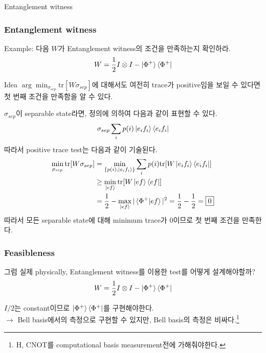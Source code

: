 \documentclass[9pt]{beamer}
\begin{document}
\begin{section}{Entanglement witness}
        \begin{frame}
            \frametitle{Entanglement witness}
            Example: 다음 $W$가 Entanglement witness의 조건을 만족하는지 확인하라.
            \begin{equation*}
                W = \frac{1}{2} I \otimes I - \ket{\Phi^+} \bra{\Phi^+}
            \end{equation*}
            \vspace{-0.2cm}
            \begin{block}{Idea}
                $\arg\min_{\sigma_{sep}} \text{tr}[W \sigma_{sep}]$에 대해서도 여전히 trace가 positive임을 보일 수 있다면 첫 번째 조건을 만족함을 알 수 있다.
            \end{block}
            $\sigma_{sep}$이 separable state라면, 정의에 의하여 다음과 같이 표현할 수 있다.
            \begin{equation*}
                \sigma_{sep} \sum_i p(i) \ket{e_if_i} \bra{e_if_i}
            \end{equation*}
            따라서 positive trace test는 다음과 같이 기술된다.
            \begin{align*}
                \min_{\rho_{sep}} \text{tr}[W\sigma_{sep}] &= \min_{\{p(i),\ket{e_if_i}\}} \sum_i p(i) \text{tr}[W \ket{e_if_i} \bra{e_if_i}] \\
                &\ge \min_{\ket{ef}} \text{tr}[W \ket{ef} \bra{ef}]\\
                &=\frac{1}{2} - \max_{\ket{ef}} |\braket{\Phi^+|ef}|^2 = \frac{1}{2} - \frac{1}{2} = \boxed{0}
            \end{align*}
            따라서 모든 separable state에 대해 minimum trace가 0이므로 첫 번째 조건을 만족한다.
        \end{frame}
        
        \begin{frame}
            \frametitle{Feasibleness}
            그럼 실제 physically, Entanglement witness를 이용한 test를 어떻게 설계해야할까?
            \begin{equation*}
                W = \frac{1}{2} I \otimes I - \ket{\Phi^+} \bra{\Phi^+}
            \end{equation*}

            $I/2$는 constant이므로 $\ket{\Phi^+} \bra{\Phi^+}$를 구현해야한다.\\
            $\rightarrow$ \alert{Bell basis에서의 측정}으로 구현할 수 있지만, Bell basis의 측정은 비싸다.\footnote{H, CNOT를 computational basis measurement전에 가해줘야한다.}
            

\end{frame}
\end{section}
\end{document}
